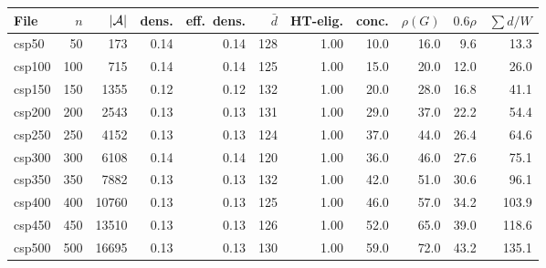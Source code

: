\begin{tabular}{lrrrrrrrrrr}
\toprule
File & $n$ & $|\mathcal{A}|$ & dens. & eff.\ dens. & $\bar d$ & HT-elig. & conc. & $\rho(G)$ & $0.6\rho$ & $\sum d/W$ \\
\midrule
csp50 & 50 & 173 & 0.14 & 0.14 & 128 & 1.00 & 10.0 & 16.0 & 9.6 & 13.3 \\
csp100 & 100 & 715 & 0.14 & 0.14 & 125 & 1.00 & 15.0 & 20.0 & 12.0 & 26.0 \\
csp150 & 150 & 1355 & 0.12 & 0.12 & 132 & 1.00 & 20.0 & 28.0 & 16.8 & 41.1 \\
csp200 & 200 & 2543 & 0.13 & 0.13 & 131 & 1.00 & 29.0 & 37.0 & 22.2 & 54.4 \\
csp250 & 250 & 4152 & 0.13 & 0.13 & 124 & 1.00 & 37.0 & 44.0 & 26.4 & 64.6 \\
csp300 & 300 & 6108 & 0.14 & 0.14 & 120 & 1.00 & 36.0 & 46.0 & 27.6 & 75.1 \\
csp350 & 350 & 7882 & 0.13 & 0.13 & 132 & 1.00 & 42.0 & 51.0 & 30.6 & 96.1 \\
csp400 & 400 & 10760 & 0.13 & 0.13 & 125 & 1.00 & 46.0 & 57.0 & 34.2 & 103.9 \\
csp450 & 450 & 13510 & 0.13 & 0.13 & 126 & 1.00 & 52.0 & 65.0 & 39.0 & 118.6 \\
csp500 & 500 & 16695 & 0.13 & 0.13 & 130 & 1.00 & 59.0 & 72.0 & 43.2 & 135.1 \\
\bottomrule
\end{tabular}
